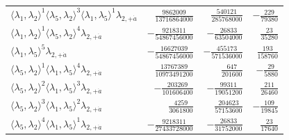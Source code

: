 \begin{longtable}{@{}lrrr@{}}
$\langle\lambda_1,\lambda_2\rangle^{1}\langle\lambda_5,\lambda_2\rangle^{3}\langle\lambda_1,\lambda_5\rangle^{1}\lambda_{2,+\dot a}$ & $\frac{9862009}{13716864000}$ & $\frac{540121}{285768000}$ & $-\frac{229}{79380}$ \\
$\langle\lambda_1,\lambda_2\rangle^{1}\langle\lambda_5,\lambda_2\rangle^{4}\lambda_{2,+\dot a}$ & $-\frac{9218311}{54867456000}$ & $-\frac{26833}{63504000}$ & $\frac{23}{35280}$ \\
$\langle\lambda_1,\lambda_5\rangle^{5}\lambda_{2,+\dot a}$ & $-\frac{16627039}{54867456000}$ & $-\frac{455173}{571536000}$ & $\frac{193}{158760}$ \\
$\langle\lambda_5,\lambda_2\rangle^{1}\langle\lambda_1,\lambda_5\rangle^{4}\lambda_{2,+\dot a}$ & $\frac{13767389}{10973491200}$ & $\frac{647}{201600}$ & $-\frac{29}{5880}$ \\
$\langle\lambda_5,\lambda_2\rangle^{2}\langle\lambda_1,\lambda_5\rangle^{3}\lambda_{2,+\dot a}$ & $-\frac{203269}{101606400}$ & $-\frac{99311}{19051200}$ & $\frac{211}{26460}$ \\
$\langle\lambda_5,\lambda_2\rangle^{3}\langle\lambda_1,\lambda_5\rangle^{2}\lambda_{2,+\dot a}$ & $\frac{4259}{3061800}$ & $\frac{204623}{57153600}$ & $-\frac{109}{19845}$ \\
$\langle\lambda_5,\lambda_2\rangle^{4}\langle\lambda_1,\lambda_5\rangle^{1}\lambda_{2,+\dot a}$ & $-\frac{9218311}{27433728000}$ & $-\frac{26833}{31752000}$ & $\frac{23}{17640}$ \\
\end{longtable}
